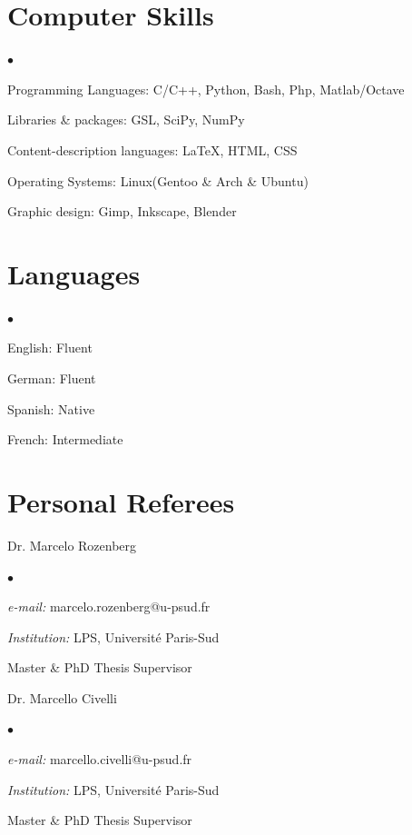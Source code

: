 \documentclass[margin,line]{res}
\newenvironment{list1}{
  \begin{list}{\ding{113}}{%
      \setlength{\itemsep}{0in}
      \setlength{\parsep}{0in} \setlength{\parskip}{0in}
      \setlength{\topsep}{0in} \setlength{\partopsep}{0in}
      \setlength{\leftmargin}{0.17in}}}{\end{list}}
\newenvironment{list2}{
  \begin{list}{$\bullet$}{%
      \setlength{\itemsep}{0in}
      \setlength{\parsep}{0in} \setlength{\parskip}{0in}
      \setlength{\topsep}{0in} \setlength{\partopsep}{0in}
      \setlength{\leftmargin}{0.2in}}}{\end{list}}
\begin{document}
\begin{resume}
\section{\sc Computer Skills}
  \begin{list2}
    \item Programming Languages:  C/C++, Python, Bash, Php, Matlab/Octave
    \item Libraries \& packages: GSL, SciPy, NumPy
    \item Content-description languages: \LaTeX, HTML, CSS
    \item Operating Systems:  Linux(Gentoo \& Arch \& Ubuntu)
    \item Graphic design: Gimp, Inkscape, Blender
  \end{list2}

\section{\sc Languages}
  \begin{list2}
    \item English: Fluent
    \item German: Fluent
    \item Spanish: Native
    \item French: Intermediate
  \end{list2}

\section{\sc Personal Referees}
\begin{list1}
  \item[] Dr. Marcelo Rozenberg
  \begin{list2}
   \item {\it e-mail:} marcelo.rozenberg@u-psud.fr
   \item {\it Institution:} LPS, Université Paris-Sud
   \item Master \& PhD Thesis Supervisor
  \end{list2}
 \end{list1}

\begin{list1}
  \item[] Dr. Marcello Civelli
  \begin{list2}
   \item {\it e-mail:} marcello.civelli@u-psud.fr
   \item {\it Institution:} LPS, Université Paris-Sud
   \item Master \& PhD Thesis Supervisor
  \end{list2}
 \end{list1}


\end{resume}
\end{document}
